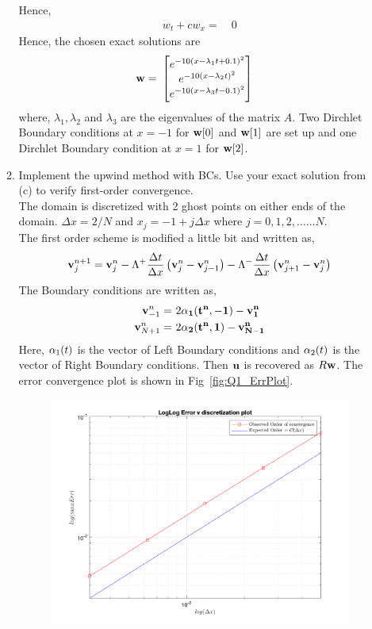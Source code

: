 \documentclass[11pt]{article}
\newcommand{\bu}{{\bf u}}
\newcommand{\bv}{{\bf v}}
\newcommand{\bw}{{\bf w}}
\newcommand{\dx}{{\Delta x}}
\newcommand{\dt}{{\Delta t}}
\newcommand{\bra}[1]{\left(#1\right)}
\begin{document}
\begin{enumerate}
\begin{enumerate}
    Hence,
    \begin{align*}
        w_t + cw_x =& \ 0
    \end{align*}
    Hence, the chosen exact solutions are
    \begin{align*}
        \bw =& \ 
        \begin{bmatrix}
        e^{-10\bra{x-\lambda_1t+0.1}^2} \\
        e^{-10\bra{x-\lambda_2t}^2} \\
        e^{-10\bra{x-\lambda_3t-0.1}^2}
        \end{bmatrix}
    \end{align*}
    where, $\lambda_1, \lambda_2$ and $\lambda_3$ are the eigenvalues of the matrix $A$. Two Dirchlet Boundary conditions at $x=-1$ for $\bw[0]$ and $\bw[1]$ are set up and one Dirchlet Boundary condition at $x=1$ for $\bw[2]$.
    \item {\color{blue}Implement the upwind method with BCs. Use your exact solution from (c) to verify first-order convergence.}\\
    The domain is discretized with 2 ghost points on either ends of the domain. $\dx = 2/N$ and $x_j = -1+j\dx$ where $j=0,1,2,\ldots \ldots N$. \\
    The first order scheme is modified a little bit and written as, 
    \begin{align*}
        \bv_j^{n+1} = \bv_j^n - \Lambda^{+}\frac{\dt}{\dx}\bra{\bv_j^n - \bv_{j-1}^n} - \Lambda^{-}\frac{\dt}{\dx}\bra{\bv_{j+1}^n-\bv^n_j}   
    \end{align*}
    The Boundary conditions are written as,
    \begin{align*}
        \bv^n_{-1} =& \ 2\bf{\alpha}_1(t^n,-1) - \bv^n_{1} \\
        \bv^n_{N+1} =& \ 2\bf{\alpha}_2(t^n,1) - \bv^n_{N-1}
    \end{align*}
    Here, ${\bf \alpha}_1(t)$ is the vector of Left Boundary conditions and ${\bf \alpha}_2(t)$ is the vector of Right Boundary conditions. Then $\bu$ is recovered as $R\bw$. The error convergence plot is shown in Fig~\ref{fig:Q1_ErrPlot}.
    \begin{figure}[htp]
        \centering
        \includegraphics[width=4in]{Q1_ErrPlot.png}

\end{figure}
\end{enumerate}
\end{enumerate}
\end{document}
